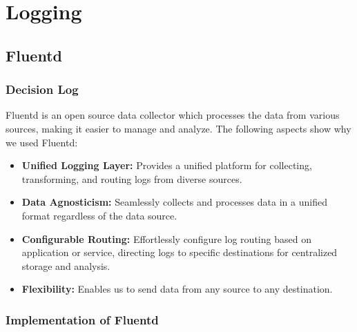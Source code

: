 \section{Logging}
\subsection{Fluentd}
\subsubsection{Decision Log}

Fluentd is an open source data collector which processes the data from various sources, making it easier to manage and analyze.
The following aspects show why we used Fluentd:
\begin{itemize}
	\item \textbf{Unified Logging Layer:} Provides a unified platform for collecting, transforming, and routing logs from diverse sources.
	\item \textbf{Data Agnosticism:} Seamlessly collects and processes data in a unified format regardless of the data source.
	\item \textbf{Configurable Routing:} Effortlessly configure log routing based on application or service, directing logs to specific destinations for centralized storage and analysis.
	\item \textbf{Flexibility:} Enables us to send data from any source to any destination.
\end{itemize}

\subsubsection{Implementation of Fluentd}

